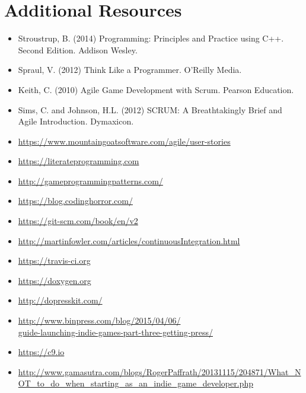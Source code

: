 \documentclass{../fal_assignment}
\begin{document}
\section*{Additional Resources}

\begin{itemize}
    \item Stroustrup, B. (2014) Programming: Principles and Practice using C++. Second Edition. Addison Wesley.
    \item Spraul, V. (2012) Think Like a Programmer. O'Reilly Media.
    \item Keith, C. (2010) Agile Game Development with Scrum. Pearson Education.
    \item Sims, C. and Johnson, H.L. (2012) SCRUM: A Breathtakingly Brief and Agile Introduction. Dymaxicon.
    \item \url{https://www.mountaingoatsoftware.com/agile/user-stories}
    \item \url{https://literateprogramming.com}
    \item \url{http://gameprogrammingpatterns.com/}
    \item \url{https://blog.codinghorror.com/}
    \item \url{https://git-scm.com/book/en/v2}
    \item \url{http://martinfowler.com/articles/continuousIntegration.html}
    \item \url{https://travis-ci.org}
    \item \url{https://doxygen.org}
    \item \url{http://dopresskit.com/}
    \item \url{http://www.binpress.com/blog/2015/04/06/}\\ \url{guide-launching-indie-games-part-three-getting-press/}
    \item \url{https://c9.io}
    \item \url{http://www.gamasutra.com/blogs/RogerPaffrath/20131115/204871/What_NOT_to_do_when_starting_as_an_indie_game_developer.php}
\end{itemize}
\end{document}
